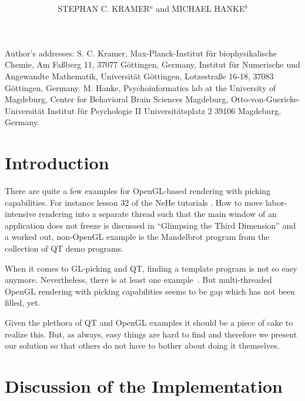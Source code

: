 \documentclass[prodmode,acmtopc]{acmsmall}
\title{
\mytitle
 }
\author{STEPHAN C. KRAMER$^a$  and MICHAEL HANKE$^b$
 \affil{$^a$Universit\"at G\"ottingen, $^b$Universit\"at Magdeburg}
 }
\begin{document}
                 \begin{bottomstuff}
                 Author's addresses: S. C. Kramer, 
                 Max-Planck-Institut f\"ur biophysikalische Chemie,
                 Am Fa\ss{}berg 11,
                 37077 G\"ottingen, Germany,
                 Institut f\"ur Numerische und Angewandte Mathematik, 
                 Universit\"at G\"ottingen, 
                 Lotzestra\ss{}e 16-18, 37083 G\"ottingen, Germany.
                 M. Hanke,
                 Psychoinformatics lab at the University of Magdeburg,
                 Center for Behavioral Brain Sciences Magdeburg,
                 Otto-von-Guericke-Universität
                 Institut  f\"ur Psychologie II
                 Universit\"atsplatz 2
                 39106 Magdeburg, Germany.
                 \end{bottomstuff}
                
 \maketitle %


\section{Introduction}
\label{sec:Introduction}

There are quite a few examples for OpenGL-based rendering with picking capabilities.
%
For instance lesson 32 of the NeHe tutorials \cite{nehe32}. 
%
How to move labor-intensive rendering into a separate thread such that the main window of an application does not freeze is discussed in ``Glimpsing the Third Dimension'' \cite{glimpse3d} and a worked out, non-OpenGL example is the Mandelbrot program from the collection of QT demo programs.

When it comes to GL-picking and QT, finding a template program is not so easy anymore.
%
Nevertheless, there is at least one example~\cite{Blanchette2008}.
%
But multi-threaded OpenGL rendering with picking capabilities seems to be gap which has not been filled, yet.

Given the plethora of QT and OpenGL examples it should be a piece of cake to realize this.
%
But, as always, easy things are hard to find and therefore we present our solution so that others do not have to bother about doing it themselves.




\section{Discussion of the Implementation}
\end{document}
